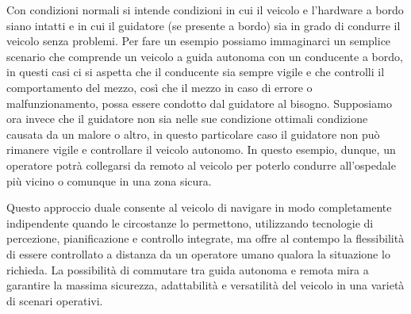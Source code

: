 \noindent Con condizioni normali si intende condizioni in cui il veicolo e l'hardware a bordo siano intatti e in cui il guidatore (se presente a bordo) sia in grado di condurre il veicolo senza problemi. Per fare un esempio possiamo immaginarci un semplice scenario che comprende un veicolo a guida autonoma con un conducente a bordo, in questi casi ci si aspetta che il conducente sia sempre vigile e che controlli il comportamento del mezzo, così che il mezzo in caso di errore o malfunzionamento, possa essere condotto dal guidatore al bisogno. Supposiamo ora invece che il guidatore non sia nelle sue condizione ottimali condizione causata da un malore o altro, in questo particolare caso il guidatore non può rimanere vigile e controllare il veicolo autonomo. In questo esempio, dunque, un operatore potrà collegarsi da remoto al veicolo per poterlo condurre all'ospedale più vicino o comunque in una zona sicura.

\noindent Questo approccio duale consente al veicolo di navigare in modo completamente indipendente quando le circostanze lo permettono, utilizzando tecnologie di percezione, pianificazione e controllo integrate, ma offre al contempo la flessibilità di essere controllato a distanza da un operatore umano qualora la situazione lo richieda. La possibilità di commutare tra guida autonoma e remota mira a garantire la massima sicurezza, adattabilità e versatilità del veicolo in una varietà di scenari operativi.
